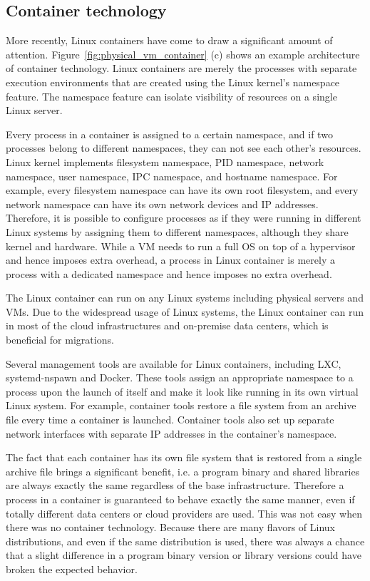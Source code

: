 \subsection{Container technology}

More recently, Linux containers\cite{menage2007adding} have come to draw a significant amount of attention.
Figure~\ref{fig:physical_vm_container} (c) shows an example architecture of container technology. 
Linux containers are merely the processes with separate execution environments that are created using the Linux kernel's namespace feature.
The namespace feature can isolate visibility of resources on a single Linux server.

Every process in a container is assigned to a certain namespace, and if two processes belong to different namespaces, they can not see each other's resources. 
Linux kernel implements filesystem namespace, PID namespace, network namespace, user namespace, IPC namespace, and hostname namespace. 
For example, every filesystem namespace can have its own root filesystem, and every network namespace can have its own network devices and IP addresses.
Therefore, it is possible to configure processes as if they were running in different Linux systems by assigning them to different namespaces, although they share kernel and hardware.
While a VM needs to run a full OS on top of a hypervisor and hence imposes extra overhead, a process in Linux container is merely a process with a dedicated namespace and hence imposes no extra overhead.

The Linux container can run on any Linux systems including physical servers and VMs.
Due to the widespread usage of Linux systems, the Linux container can run in most of the cloud infrastructures and on-premise data centers, which is beneficial for migrations.

Several management tools are available for Linux containers, including LXC\cite{noronha2018performance}, systemd-nspawn\cite{jedge2013} and Docker\cite{merkel2014docker}.
These tools assign an appropriate namespace to a process upon the launch of itself and make it look like running in its own virtual Linux system.
For example, container tools restore a file system from an archive file every time a container is launched. 
Container tools also set up separate network interfaces with separate IP addresses in the container's namespace.

The fact that each container has its own file system that is restored from a single archive file brings a significant benefit, i.e. a program binary and shared libraries are always exactly the same regardless of the base infrastructure.
Therefore a process in a container is guaranteed to behave exactly the same manner, even if totally different data centers or cloud providers are used.
This was not easy when there was no container technology.
Because there are many flavors of Linux distributions, and even if the same distribution is used, there was always a chance that a slight difference in a program binary version or library versions could have broken the expected behavior.

